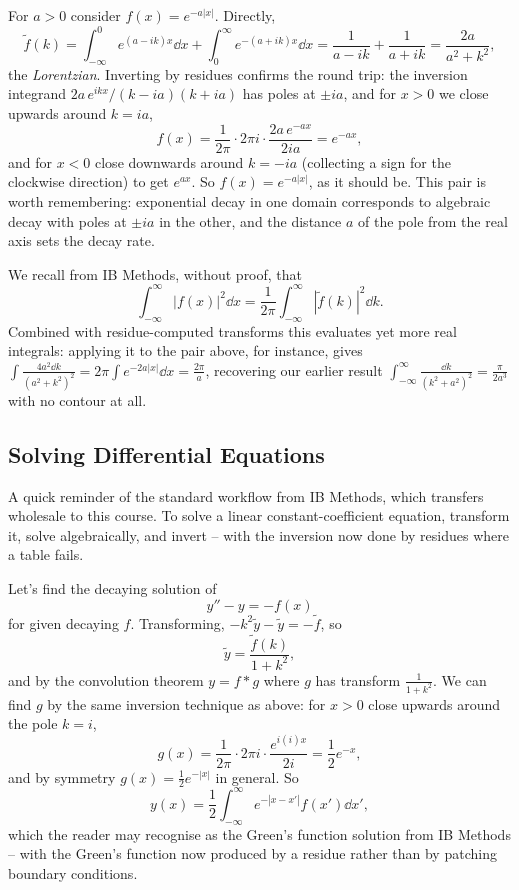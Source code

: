 \documentclass[a4paper]{scrartcl}
\begin{document}
\begin{example}
	For $a > 0$ consider $f(x) = e^{-a|x|}$. Directly,
	$$
	\tilde f(k) = \int_{-\infty}^0 e^{(a - ik)x} \dd x + \int_0^\infty e^{-(a + ik)x} \dd x = \frac{1}{a - ik} + \frac{1}{a + ik} = \frac{2a}{a^2 + k^2},
	$$
	the \emph{Lorentzian}. Inverting by residues confirms the round trip: the inversion integrand $2a\, e^{ikx}/(k - ia)(k + ia)$ has poles at $\pm ia$, and for $x > 0$ we close upwards around $k = ia$,
	$$
	f(x) = \frac{1}{2\pi} \cdot 2\pi i \cdot \frac{2a\, e^{-ax}}{2ia} = e^{-ax},
	$$
	and for $x < 0$ close downwards around $k = -ia$ (collecting a sign for the clockwise direction) to get $e^{ax}$. So $f(x) = e^{-a|x|}$, as it should be. This pair is worth remembering: exponential decay in one domain corresponds to algebraic decay with poles at $\pm ia$ in the other, and the distance $a$ of the pole from the real axis sets the decay rate.
\end{example}

\begin{remark}
	We recall from IB Methods, without proof, that
	$$
	\int_{-\infty}^\infty |f(x)|^2 \dd x = \frac{1}{2\pi} \int_{-\infty}^\infty |\tilde f(k)|^2 \dd k.
	$$
	Combined with residue-computed transforms this evaluates yet more real integrals: applying it to the pair above, for instance, gives $\int \frac{4a^2 \dd k}{(a^2 + k^2)^2} = 2\pi \int e^{-2a|x|}\dd x = \frac{2\pi}{a}$, recovering our earlier result $\int_{-\infty}^{\infty} \frac{\dd k}{(k^2 + a^2)^2} = \frac{\pi}{2a^3}$ with no contour at all.
\end{remark}

\subsection{Solving Differential Equations}

A quick reminder of the standard workflow from IB Methods, which transfers wholesale to this course. To solve a linear constant-coefficient equation, transform it, solve algebraically, and invert -- with the inversion now done by residues where a table fails.

\begin{example}
	Let's find the decaying solution of
	$$
	y'' - y = -f(x)
	$$
	for given decaying $f$. Transforming, $-k^2 \tilde y - \tilde y = -\tilde f$, so
	$$
	\tilde y = \frac{\tilde f(k)}{1 + k^2},
	$$
	and by the convolution theorem $y = f * g$ where $g$ has transform $\frac{1}{1 + k^2}$. We can find $g$ by the same inversion technique as above: for $x > 0$ close upwards around the pole $k = i$,
	$$
	g(x) = \frac{1}{2\pi} \cdot 2\pi i \cdot \frac{e^{i(i)x}}{2i} = \frac{1}{2} e^{-x},
	$$
	and by symmetry $g(x) = \frac 12 e^{-|x|}$ in general. So
	$$
	y(x) = \frac{1}{2}\int_{-\infty}^\infty e^{-|x - x'|} f(x') \dd x',
	$$
	which the reader may recognise as the Green's function solution from IB Methods -- with the Green's function now produced by a residue rather than by patching boundary conditions.
\end{example}
\end{document}
